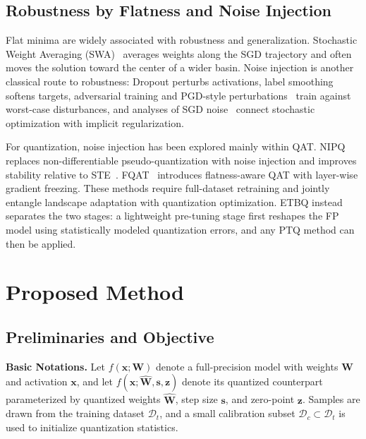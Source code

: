 \documentclass{article}
\begin{document}
\subsection{Robustness by Flatness and Noise Injection}

Flat minima are widely associated with robustness and generalization. Stochastic Weight Averaging (SWA)~\cite{DBLP:journals/corr/abs-1803-05407,DBLP:journals/corr/abs-1902-02476} averages weights along the SGD trajectory and often moves the solution toward the center of a wider basin. Noise injection is another classical route to robustness: Dropout perturbs activations, label smoothing~\cite{szegedy2015rethinkinginceptionarchitecturecomputer} softens targets, adversarial training and PGD-style perturbations~\cite{jin2017escapesaddlepointsefficiently} train against worst-case disturbances, and analyses of SGD noise~\cite{mandt2018stochasticgradientdescentapproximate,simsekli2019tailindexanalysisstochasticgradient} connect stochastic optimization with implicit regularization.

For quantization, noise injection has been explored mainly within QAT. NIPQ~\cite{shin-nipq-cvpr-2023} replaces non-differentiable pseudo-quantization with noise injection and improves stability relative to STE~\cite{bengio-ste-arxiv-2013}. FQAT~\cite{fqat-acmmm-2025} introduces flatness-aware QAT with layer-wise gradient freezing. These methods require full-dataset retraining and jointly entangle landscape adaptation with quantization optimization. ETBQ instead separates the two stages: a lightweight pre-tuning stage first reshapes the FP model using statistically modeled quantization errors, and any PTQ method can then be applied.

\section{Proposed Method}
\label{sec:method}

\subsection{Preliminaries and Objective}
\label{sec:method_prelim}

\textbf{Basic Notations.} Let $f(\boldsymbol{x}; \boldsymbol{W})$ denote a full-precision model with weights $\boldsymbol{W}$ and activation $\boldsymbol{x}$, and let $f(\boldsymbol{x}; \hat{\boldsymbol{W}}, \boldsymbol{s}, \boldsymbol{z})$ denote its quantized counterpart parameterized by quantized weights $\hat{\boldsymbol{W}}$, step size $\boldsymbol{s}$, and zero-point $\boldsymbol{z}$. Samples are drawn from the training dataset $\mathscr{D}_{t}$, and a small calibration subset $\mathscr{D}_{c} \subset \mathscr{D}_{t}$ is used to initialize quantization statistics.
\end{document}
